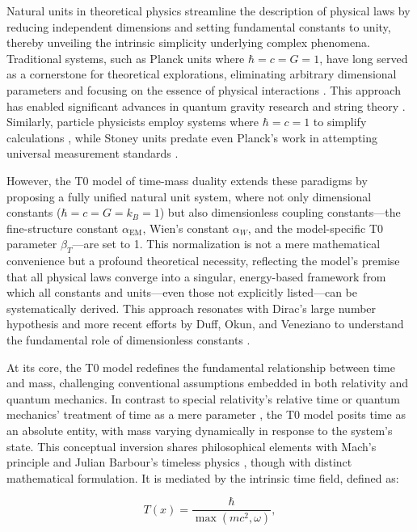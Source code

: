 \documentclass[twocolumn,aps,prl]{revtex4-2}
\begin{document}
	Natural units in theoretical physics streamline the description of physical laws by reducing independent dimensions and setting fundamental constants to unity, thereby unveiling the intrinsic simplicity underlying complex phenomena. Traditional systems, such as Planck units where $\hbar = c = G = 1$, have long served as a cornerstone for theoretical explorations, eliminating arbitrary dimensional parameters and focusing on the essence of physical interactions \cite{Planck1899}. This approach has enabled significant advances in quantum gravity research \cite{Rovelli2004, Ashtekar2007} and string theory \cite{Greene1999}. Similarly, particle physicists employ systems where $\hbar = c = 1$ to simplify calculations \cite{Peskin1995}, while Stoney units predate even Planck's work in attempting universal measurement standards \cite{Stoney1881}.
	
	However, the T0 model of time-mass duality extends these paradigms by proposing a fully unified natural unit system, where not only dimensional constants ($\hbar = c = G = k_B = 1$) but also dimensionless coupling constants—the fine-structure constant $\alpha_{\text{EM}}$, Wien's constant $\alpha_W$, and the model-specific T0 parameter $\beta_T$—are set to 1. This normalization is not a mere mathematical convenience but a profound theoretical necessity, reflecting the model's premise that all physical laws converge into a singular, energy-based framework from which all constants and units—even those not explicitly listed—can be systematically derived. This approach resonates with Dirac's large number hypothesis \cite{Dirac1937} and more recent efforts by Duff, Okun, and Veneziano to understand the fundamental role of dimensionless constants \cite{Duff2002}.
	
	At its core, the T0 model redefines the fundamental relationship between time and mass, challenging conventional assumptions embedded in both relativity and quantum mechanics. In contrast to special relativity's relative time \cite{Einstein1905} or quantum mechanics' treatment of time as a mere parameter \cite{Schrodinger1926}, the T0 model posits time as an absolute entity, with mass varying dynamically in response to the system's state. This conceptual inversion shares philosophical elements with Mach's principle \cite{Mach1893} and Julian Barbour's timeless physics \cite{Barbour1999}, though with distinct mathematical formulation. It is mediated by the intrinsic time field, defined as:
	
	\begin{equation}
		T(x) = \frac{\hbar}{\max(mc^2, \omega)}, \label{eq:intrinsic_time}
	\end{equation}
	
\end{document}
